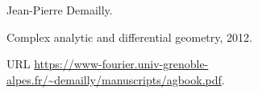 Jean-Pierre Demailly.

\newblock Complex analytic and differential geometry, 2012.

\newblock URL
  \url{https://www-fourier.univ-grenoble-alpes.fr/~demailly/manuscripts/agbook.pdf}.
